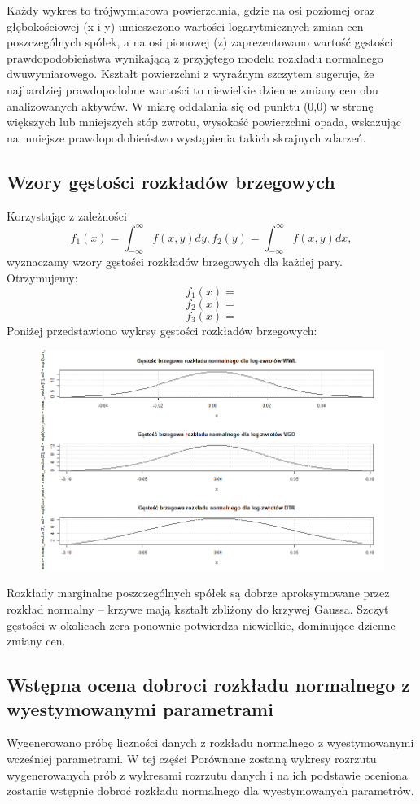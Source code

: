 \documentclass[a4paper,11pt]{article}
\begin{document}
Każdy wykres to trójwymiarowa powierzchnia, gdzie na osi poziomej oraz głębokościowej (x i y) umieszczono wartości logarytmicznych zmian cen poszczególnych spółek, a na osi pionowej (z) zaprezentowano wartość gęstości prawdopodobieństwa wynikającą z przyjętego modelu rozkładu normalnego dwuwymiarowego. Kształt powierzchni z wyraźnym szczytem sugeruje, że najbardziej prawdopodobne wartości to niewielkie dzienne zmiany cen obu analizowanych aktywów. W miarę oddalania się od punktu (0,0) w stronę większych lub mniejszych stóp zwrotu, wysokość powierzchni opada, wskazując na mniejsze prawdopodobieństwo wystąpienia takich skrajnych zdarzeń. 

\subsection{Wzory gęstości rozkładów brzegowych}
Korzystając z zależności
$$f_1(x)=\int_{-\infty}^{\infty}f(x,y)dy, f_2(y)=\int_{-\infty}^{\infty}f(x,y)dx,$$
wyznaczamy wzory gęstości rozkładów brzegowych dla każdej pary.\\ Otrzymujemy:
$$f_1(x)=$$
$$f_2(x)=$$
$$f_3(x)=$$
Poniżej przedstawiono wykrsy gęstości rozkładów brzegowych:
\begin{figure}[H]
    \centering
    \includegraphics[width=1\textwidth]{./img/gestosci-brzegowe.png}
\end{figure}
Rozkłady marginalne poszczególnych spółek są dobrze aproksymowane przez rozkład normalny – krzywe mają kształt zbliżony do krzywej Gaussa. Szczyt gęstości w okolicach zera ponownie potwierdza niewielkie, dominujące dzienne zmiany cen.

\subsection{Wstępna ocena dobroci rozkładu normalnego z wyestymowanymi parametrami}
Wygenerowano próbę liczności danych z rozkładu normalnego z wyestymowanymi wcześniej parametrami. W tej części Porównane zostaną wykresy rozrzutu wygenerowanych prób z wykresami rozrzutu danych i na ich podstawie oceniona zostanie wstępnie dobroć rozkładu normalnego dla wyestymowanych parametrów.
\end{document}
